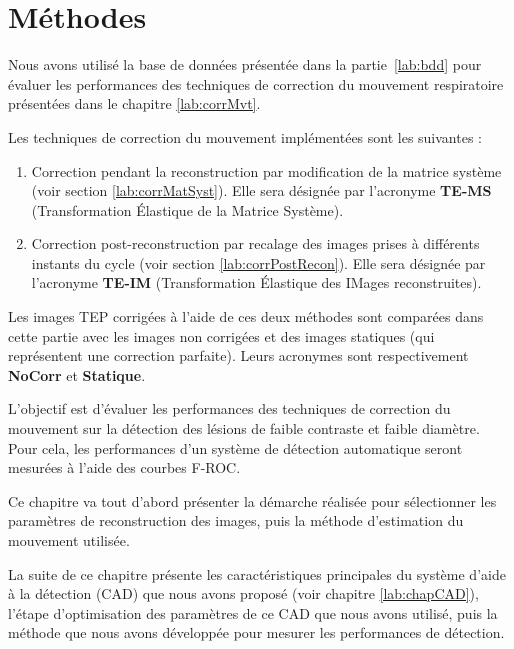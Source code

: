 \chapter{Méthodes}

Nous avons utilisé la base de données présentée dans la partie~\ref{lab:bdd} pour évaluer les performances des techniques de correction du mouvement respiratoire présentées dans le chapitre \ref{lab:corrMvt}. 

Les techniques de correction du mouvement implémentées sont les suivantes :

\begin{enumerate}
 \item Correction pendant la reconstruction par modification de la matrice système (voir section \ref{lab:corrMatSyst}). Elle sera désignée par l'acronyme \textbf{TE-MS} (Transformation \'Elastique de la Matrice Système).
 \item Correction post-reconstruction par recalage des images prises à différents instants du cycle (voir section \ref{lab:corrPostRecon}). Elle sera désignée par l'acronyme \textbf{TE-IM} (Transformation \'Elastique des IMages reconstruites).
\end{enumerate}

Les images TEP corrigées à l'aide de ces deux méthodes sont comparées dans cette partie avec les images non corrigées et des images statiques (qui représentent une correction parfaite). Leurs acronymes sont respectivement \textbf{NoCorr} et \textbf{Statique}.

L'objectif est d'évaluer les performances des techniques de correction du mouvement sur la détection des lésions de faible contraste et faible diamètre. Pour cela, les performances d'un système de détection automatique seront mesurées à l'aide des courbes F-ROC.

Ce chapitre va tout d'abord présenter la démarche réalisée pour sélectionner les paramètres de reconstruction des images, puis la méthode d'estimation du mouvement utilisée. 

La suite de ce chapitre présente les caractéristiques principales du système d'aide à la détection (CAD) que nous avons proposé (voir chapitre \ref{lab:chapCAD}), l'étape d'optimisation des paramètres de ce CAD que nous avons utilisé, puis la méthode que nous avons développée pour mesurer les performances de détection.




